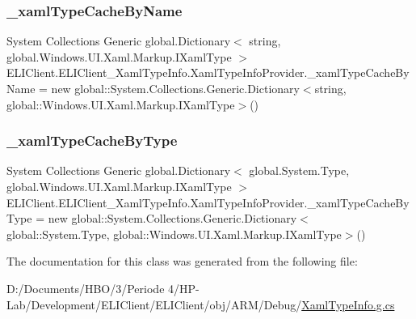 \subsubsection{\texorpdfstring{\+\_\+xaml\+Type\+Cache\+By\+Name}{\_xamlTypeCacheByName}}
{\footnotesize\ttfamily System Collections Generic global.\+Dictionary$<$ string, global.\+Windows.\+U\+I.\+Xaml.\+Markup.\+I\+Xaml\+Type $>$ E\+L\+I\+Client.\+E\+L\+I\+Client\+\_\+\+Xaml\+Type\+Info.\+Xaml\+Type\+Info\+Provider.\+\_\+xaml\+Type\+Cache\+By\+Name = new global\+::\+System.\+Collections.\+Generic.\+Dictionary$<$string, global\+::\+Windows.\+U\+I.\+Xaml.\+Markup.\+I\+Xaml\+Type$>$()\hspace{0.3cm}{\ttfamily [private]}}

\mbox{\label{class_e_l_i_client_1_1_e_l_i_client___xaml_type_info_1_1_xaml_type_info_provider_a6cd0f824ae3036446ca977ae7fdaf9af}} 
\subsubsection{\texorpdfstring{\+\_\+xaml\+Type\+Cache\+By\+Type}{\_xamlTypeCacheByType}}
{\footnotesize\ttfamily System Collections Generic global.\+Dictionary$<$ global.\+System.\+Type, global.\+Windows.\+U\+I.\+Xaml.\+Markup.\+I\+Xaml\+Type $>$ E\+L\+I\+Client.\+E\+L\+I\+Client\+\_\+\+Xaml\+Type\+Info.\+Xaml\+Type\+Info\+Provider.\+\_\+xaml\+Type\+Cache\+By\+Type = new global\+::\+System.\+Collections.\+Generic.\+Dictionary$<$global\+::\+System.\+Type, global\+::\+Windows.\+U\+I.\+Xaml.\+Markup.\+I\+Xaml\+Type$>$()\hspace{0.3cm}{\ttfamily [private]}}



The documentation for this class was generated from the following file\+:\begin{DoxyCompactItemize}
\item 
D\+:/\+Documents/\+H\+B\+O/3/\+Periode 4/\+H\+P-\/\+Lab/\+Development/\+E\+L\+I\+Client/\+E\+L\+I\+Client/obj/\+A\+R\+M/\+Debug/\hyperlink{_e_l_i_client_2_e_l_i_client_2obj_2_a_r_m_2_debug_2_xaml_type_info_8g_8cs}{Xaml\+Type\+Info.\+g.\+cs}\end{DoxyCompactItemize}
